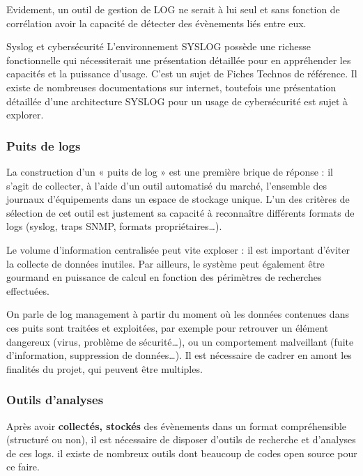  Evidement, un outil de gestion de LOG ne serait à lui seul et sans fonction de corrélation avoir la capacité de détecter des évènements liés entre eux. 
 
\begin{warningbox}{Syslog et cybersécurité}
	L'environnement SYSLOG possède une richesse fonctionnelle qui nécessiterait une présentation détaillée pour en appréhender les capacités et la puissance d'usage. C'est un sujet de Fiches Technos de référence. Il existe de nombreuses documentations sur internet, toutefois une présentation détaillée d'une architecture SYSLOG pour un usage de cybersécurité est sujet à explorer. 
\end{warningbox}

\subsubsection{Puits de logs}

La construction d’un « puits de log » est une première brique de réponse : il s’agit de collecter, à l’aide d’un outil automatisé du marché, l’ensemble des journaux d’équipements dans un espace de stockage unique. L’un des critères de sélection de cet outil est justement sa capacité à reconnaître différents formats de logs (syslog, traps SNMP, formats propriétaires…).

Le volume d’information centralisée peut vite exploser : il est important d’éviter la collecte de données inutiles. Par ailleurs, le système peut également être gourmand en puissance de calcul en fonction des périmètres de recherches effectuées.

On parle de log management à partir du moment où les données contenues dans ces  puits sont traitées et exploitées, par exemple pour retrouver un élément dangereux (virus, problème de sécurité…), ou un comportement malveillant (fuite d’information, suppression de données…). Il est nécessaire de cadrer en amont les finalités du projet,  qui peuvent être multiples.

\subsubsection{Outils d'analyses}

Après avoir \textbf{collectés, stockés} des évènements dans un format compréhensible (structuré ou non), il est nécessaire de disposer d'outils de recherche et d'analyses de ces logs. il existe de nombreux outils  dont beaucoup de codes open source pour ce faire.


